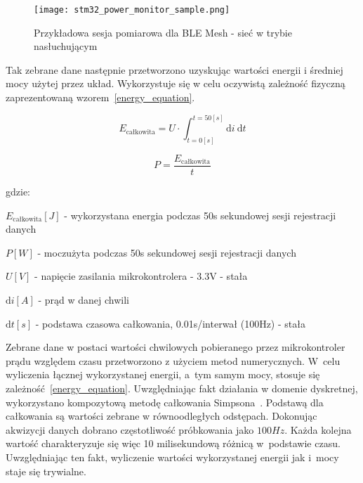 \begin{figure}[!htb]
	\centering \texttt{[image: stm32\_power\_monitor\_sample.png]}
	\caption{Przykładowa sesja pomiarowa dla BLE Mesh - sieć w trybie nasłuchującym}
	\label{rys:measurement_session_sample}
\end{figure}

Tak zebrane dane następnie przetworzono uzyskując wartości energii i średniej mocy
użytej przez układ. Wykorzystuje się w celu oczywistą zależność fizyczną zaprezentowaną
wzorem~\ref{energy_equation}\cite{skoro_marta_fizyka_1973}.

\begin{equation} \label{energy_equation}
E_{\text{całkowita}} = U \cdot \int_{t=0[s]}^{t=50[s]} \mathrm{d}i \: \mathrm{d} t
\end{equation}

\begin{equation} \label{power_equation}
P = \frac{E_{\text{całkowita}}}{t}
\end{equation}

gdzie:

\begin{description}
\item $E_{\text{całkowita}} [J]$ - wykorzystana energia podczas 50s sekundowej sesji rejestracji danych
\item $P [W]$ - moczużyta podczas 50s sekundowej sesji rejestracji danych
\item $U [V]$ - napięcie zasilania mikrokontrolera - 3.3V - stała
\item $\mathrm{d}i [A]$ - prąd w danej chwili
\item $\mathrm{d}t [s]$ - podstawa czasowa całkowania, 0.01s/interwał (100Hz) - stała 
\end{description}

Zebrane dane w postaci wartości chwilowych pobieranego przez mikrokontroler prądu względem czasu
przetworzono z użyciem metod numerycznych. W~celu wyliczenia łącznej wykorzystanej energii, a~tym samym
mocy, stosuje się zależność~\ref{energy_equation}. Uwzględniając fakt działania w domenie dyskretnej,
wykorzystano kompozytową metodę całkowania Simpsona~\cite{noauthor_scipyintegratesimpson_nodate}.
Podstawą dla całkowania są wartości zebrane w równoodległych odstępach. Dokonując akwizycji danych
dobrano częstotliwość próbkowania jako $100Hz$. Każda kolejna wartość charakteryzuje się więc
10 milisekundową różnicą w~podstawie czasu. Uwzględniając ten fakt, wyliczenie wartości
wykorzystanej energii jak i~mocy staje się trywialne.

